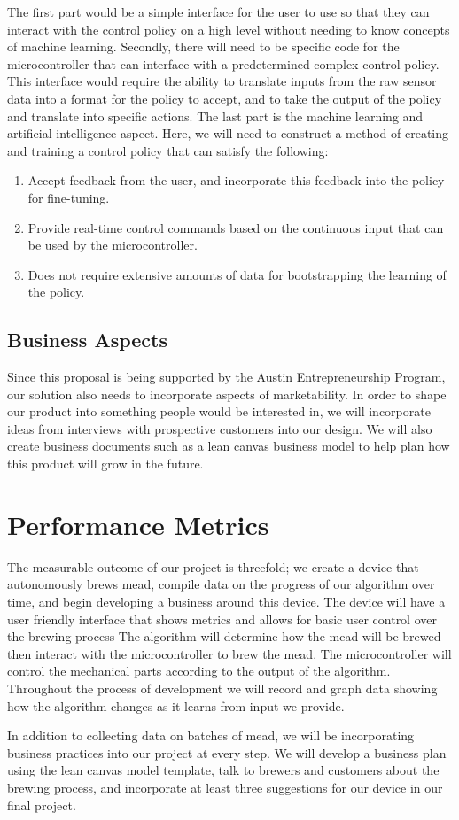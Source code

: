 \documentclass[letterpaper,10pt]{article}
\begin{document}
The first part would be a simple interface for the user to use so that they can interact with the control policy on a high level without needing to know concepts of machine learning.
Secondly, there will need to be specific code for the microcontroller that can interface with a predetermined complex control policy.
This interface would require the ability to translate inputs from the raw sensor data into a format for the policy to accept, and to take the  output of the policy and translate into specific actions.
The last part is the machine learning and artificial intelligence aspect.
Here, we will need to construct a method of creating and training a control policy that can satisfy the following:
\begin{enumerate}
	\item Accept feedback from the user, and incorporate this feedback into the policy for fine-tuning.
	\item Provide real-time control commands based on the continuous input that can be used by the microcontroller.
	\item Does not require extensive amounts of data for bootstrapping the learning of the policy.
\end{enumerate}

\subsection{Business Aspects}
Since this proposal is being supported by the Austin Entrepreneurship Program, our solution also needs to incorporate aspects of marketability.
In order to shape our product into something people would be interested in, we will incorporate ideas from interviews with prospective customers into our design.
We will also create business documents such as a lean canvas business model to help plan how this product will grow in the future.

\section{Performance Metrics}
The measurable outcome of our project is threefold; we create a device that 
autonomously brews mead, compile data on the progress of our algorithm 
over time, and begin developing a business around this device. 
The device will have a user friendly interface that shows metrics and allows
for basic user control over the brewing process The algorithm will determine
how the mead will be brewed then interact with the microcontroller to brew 
the mead. The microcontroller will control the mechanical parts according to
the output of the algorithm. Throughout the process of development we 
will record and graph data showing how the algorithm changes as it learns 
from input we provide. 

In addition to collecting data on batches of mead, we will be 
incorporating business practices into our project at every step. We will 
develop a business plan using the lean canvas model template, talk to 
brewers and customers about the brewing process, and incorporate at least 
three suggestions for our device in our final project.
\end{document}
